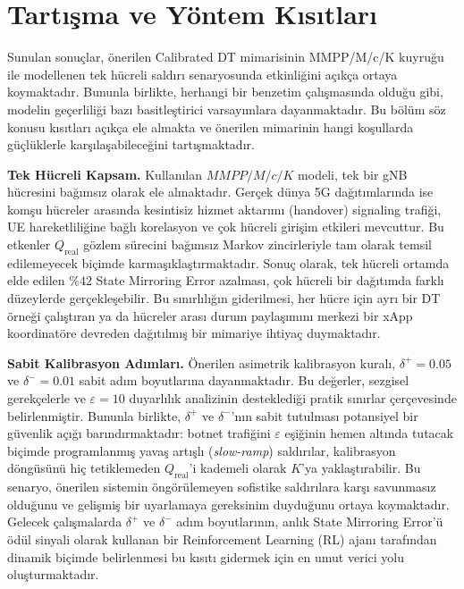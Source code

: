 \documentclass[conference]{IEEEtran}
\newcommand{\qreal}{Q_{\mathrm{real}}}
\begin{document}
\section{Tartışma ve Yöntem Kısıtları}

Sunulan sonuçlar, önerilen Calibrated DT mimarisinin MMPP/M/c/K kuyruğu
ile modellenen tek hücreli saldırı senaryosunda etkinliğini açıkça ortaya
koymaktadır. Bununla birlikte, herhangi bir benzetim çalışmasında olduğu
gibi, modelin geçerliliği bazı basitleştirici varsayımlara dayanmaktadır.
Bu bölüm söz konusu kısıtları açıkça ele almakta ve önerilen mimarinin
hangi koşullarda güçlüklerle karşılaşabileceğini tartışmaktadır.

\textbf{Tek Hücreli Kapsam.} Kullanılan $MMPP/M/c/K$ modeli, tek bir gNB
hücresini bağımsız olarak ele almaktadır. Gerçek dünya 5G dağıtımlarında ise
komşu hücreler arasında kesintisiz hizmet aktarımı (handover) signaling
trafiği, UE hareketliliğine bağlı korelasyon ve çok hücreli girişim etkileri
mevcuttur. Bu etkenler $\qreal$ gözlem sürecini bağımsız Markov zincirleriyle
tam olarak temsil edilemeyecek biçimde karmaşıklaştırmaktadır. Sonuç olarak,
tek hücreli ortamda elde edilen $\%42$ State Mirroring Error azalması, çok
hücreli bir dağıtımda farklı düzeylerde gerçekleşebilir. Bu sınırlılığın
giderilmesi, her hücre için ayrı bir DT örneği çalıştıran ya da hücreler arası
durum paylaşımını merkezi bir xApp koordinatöre devreden dağıtılmış bir
mimariye ihtiyaç duymaktadır.

\textbf{Sabit Kalibrasyon Adımları.} Önerilen asimetrik kalibrasyon kuralı,
$\delta^{+} = 0.05$ ve $\delta^{-} = 0.01$ sabit adım boyutlarına
dayanmaktadır. Bu değerler, sezgisel gerekçelerle ve $\varepsilon = 10$
duyarlılık analizinin desteklediği pratik sınırlar çerçevesinde belirlenmiştir.
Bununla birlikte, $\delta^{+}$ ve $\delta^{-}$'nın sabit tutulması potansiyel
bir güvenlik açığı barındırmaktadır: botnet trafiğini $\varepsilon$ eşiğinin
hemen altında tutacak biçimde programlanmış yavaş artışlı (\emph{slow-ramp})
saldırılar, kalibrasyon döngüsünü hiç tetiklemeden $\qreal$'i kademeli olarak
$K$'ya yaklaştırabilir. Bu senaryo, önerilen sistemin öngörülemeyen sofistike
saldırılara karşı savunmasız olduğunu ve gelişmiş bir uyarlamaya gereksinim
duyduğunu ortaya koymaktadır. Gelecek çalışmalarda $\delta^{+}$ ve $\delta^{-}$
adım boyutlarının, anlık State Mirroring Error'ü ödül sinyali olarak kullanan
bir Reinforcement Learning (RL) ajanı tarafından dinamik biçimde belirlenmesi
bu kısıtı gidermek için en umut verici yolu oluşturmaktadır.
\end{document}
